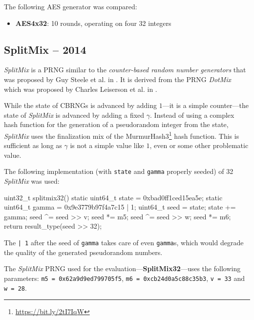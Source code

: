     The following AES generator was compared:
    \begin{itemize}
		\itemsep0em
        \item \textbf{AES4x32}: 10 rounds, operating on four \SI{32}{\bit} integers
    \end{itemize}

\subsection[SplitMix -- 2014]{SplitMix -- 2014} \label{subsec:splitmix}

    \emph{SplitMix} is a PRNG similar to the \emph{counter-based random number generators} that was proposed by Guy Steele et al. in \cite{Steele:2014}. It is derived from the PRNG \emph{DotMix} which was proposed by Charles Leiserson et al. in \cite{Leiserson:2012}.

    While the state of CBRNGs is advanced by adding $1$---it is a simple counter---the state of \emph{SplitMix} is advanced by adding a fixed $\gamma$. Instead of using a complex hash function for the generation of a pseudorandom integer from the state, \emph{SplitMix} uses the finalization mix of the MurmurHash3\footnote{\url{https://bit.ly/2tI7IqW}} hash function. This is sufficient as long as $\gamma$ is not a simple value like $1$, even or some other problematic value.

    The following implementation (with \lstinline|state| and \lstinline|gamma| properly seeded) of \SI{32}{\bit} \emph{SplitMix} was used:
\begin{@empty}
    \lstset{
        language = [ISO]C++
    }
\begin{centeredshadowboxlisting}
uint32_t splitmix32() {
    static uint64_t state = 0xbad0ff1ced15ea5e;
    static uint64_t gamma = 0x9e3779b97f4a7c15
                          | 1;
    uint64_t seed = state;
    state += gamma;
    seed ^= seed >> v;
    seed *= m5;
    seed ^= seed >> w;
    seed *= m6;
    return result_type(seed >> 32);
}
\end{centeredshadowboxlisting}
\end{@empty}
    The \lstinline{| 1} after the seed of \lstinline|gamma| takes care of even \lstinline|gamma|s, which would degrade the quality of the generated pseudorandom numbers.

    The \emph{SplitMix} PRNG used for the evaluation---\textbf{SplitMix32}---uses the following parameters: \lstinline|m5 = 0x62a9d9ed799705f5|, \lstinline|m6 = 0xcb24d0a5c88c35b3|, \lstinline|v = 33| and \lstinline|w = 28|.

